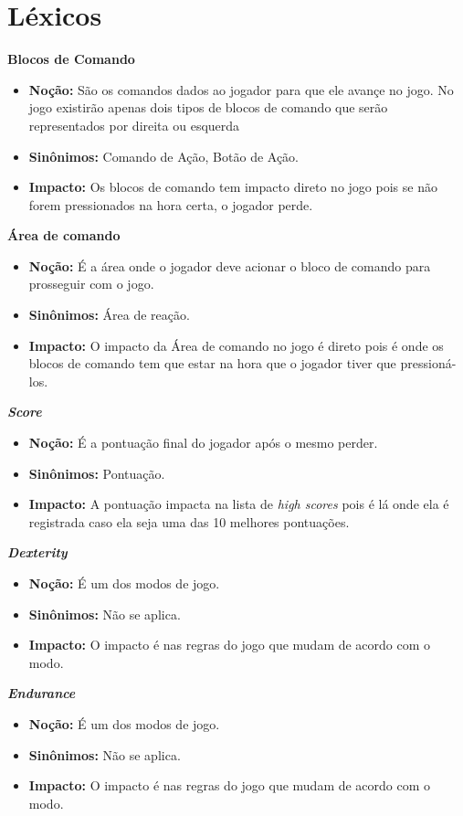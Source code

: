 \section{Léxicos}

\textbf{Blocos de Comando}
\begin{itemize}
\item\textbf{Noção:} São os comandos dados ao jogador para que ele avançe no jogo. No jogo existirão apenas dois tipos de blocos de comando que serão representados por direita ou esquerda
\item\textbf{Sinônimos:} Comando de Ação, Botão de Ação.
\item\textbf{Impacto:} Os blocos de comando tem impacto direto no jogo pois se não forem pressionados na hora certa, o jogador perde.
\end{itemize}

\textbf{Área de comando}
\begin{itemize}
\item\textbf{Noção:} É a área onde o jogador deve acionar o bloco de comando para prosseguir com o jogo.
\item\textbf{Sinônimos:} Área de reação.
\item\textbf{Impacto:} O impacto da Área de comando no jogo é direto pois é onde os blocos de comando tem que estar na hora que o jogador tiver que pressioná-los.
\end{itemize}

\textbf{\textit{Score}}
\begin{itemize}
\item\textbf{Noção:} É a pontuação final do jogador após o mesmo perder.
\item\textbf{Sinônimos:} Pontuação.
\item\textbf{Impacto:} A pontuação impacta na lista de \textit{high scores} pois é lá onde ela é registrada caso ela seja uma das 10 melhores pontuações.
\end{itemize}

\textbf{\textit{Dexterity}}
\begin{itemize}
\item\textbf{Noção:} É um dos modos de jogo.
\item\textbf{Sinônimos:} Não se aplica.
\item\textbf{Impacto:} O impacto é nas regras do jogo que mudam de acordo com o modo.
\end{itemize}

\textbf{\textit{Endurance}}
\begin{itemize}
\item\textbf{Noção:} É um dos modos de jogo.
\item\textbf{Sinônimos:} Não se aplica.
\item\textbf{Impacto:} O impacto é nas regras do jogo que mudam de acordo com o modo.
\end{itemize}

